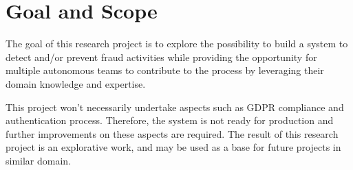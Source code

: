 \section{Goal and Scope}

  The goal of this research project is to explore the possibility to build a system to detect and/or prevent fraud activities while providing the opportunity for multiple autonomous teams to contribute to the process by leveraging their domain knowledge and expertise.

  This project won't necessarily undertake aspects such as GDPR compliance and authentication process. Therefore, the system is not ready for production and further improvements on these aspects are required. The result of this research project is an explorative work, and may be used as a base for future projects in similar domain.  